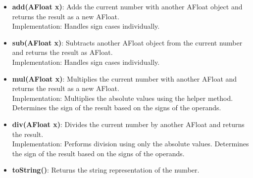 \documentclass{article}
\begin{document}
\begin{itemize}
    \item \textbf{add(AFloat x)}: Adds the current number with another AFloat object and returns the result as a new AFloat. \\
    Implementation: Handles sign cases individually.

    \item \textbf{sub(AFloat x)}: Subtracts another AFloat object from the current number and returns the result as AFloat. \\
    Implementation: Handles sign cases individually.

    \item \textbf{mul(AFloat x)}: Multiplies the current number with another AFloat and returns the result as a new AFloat. \\
    Implementation: Multiplies the absolute values using the helper method. Determines the sign of the result based on the signs of the operands.

    \item \textbf{div(AFloat x)}: Divides the current number by another AFloat and returns the result. \\
    Implementation: Performs division using only the absolute values. Determines the sign of the result based on the signs of the operands.

    \item \textbf{toString()}: Returns the string representation of the number.
    
\end{itemize}
\end{document}
